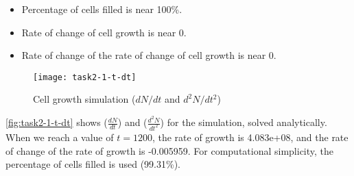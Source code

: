 \begin{itemize}
    \item Percentage of cells filled is near 100\%.
    \item Rate of change of cell growth is near 0.
    \item Rate of change of the rate of change of cell growth is near 0.
\end{itemize}

\begin{figure}[ht]
    \centering
    \texttt{[image: task2-1-t-dt]}
    \caption[Cell growth simulation ($dN/dt$ and $d^2N/dt^2$)]{Cell growth simulation ($dN/dt$ and $d^2N/dt^2$)}
    \label{fig:task2-1-t-dt}
\end{figure}









\autoref{fig:task2-1-t-dt} shows ($\frac{dN}{dt}$) and ($\frac{d^2N}{dt^2}$) for the simulation, solved analytically.
When we reach a value of $t = 1200$, the rate of growth is 4.083e+08, and the rate of change of the rate of growth is -0.005959.
For computational simplicity, the percentage of cells filled is used (99.31\%).

